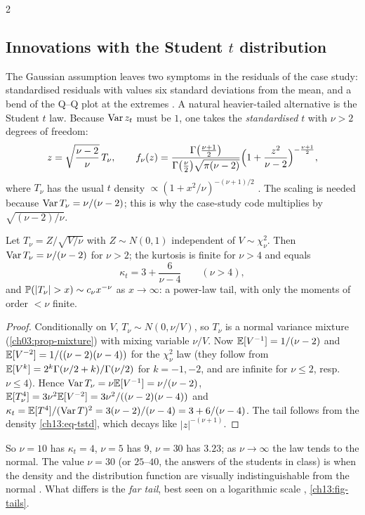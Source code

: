 \begin{paracol}{2}
\subsection{Innovations with the Student $t$ distribution}\label{ch13:sec-t}
The Gaussian assumption leaves two symptoms in the residuals of the case study: standardised residuals with values six standard deviations from the mean, and a bend of the Q--Q plot at the extremes
. A natural heavier-tailed alternative is the Student $t$ law. Because $\operatorname{Var} z_t$ must be $1$, one takes the \emph{standardised} $t$ with $\nu>2$ degrees of freedom:
\begin{equation}\label{ch13:eq-tstd}
  z=\sqrt{\frac{\nu-2}{\nu}}\,T_\nu,\qquad
  f_\nu(z)=\frac{\Gamma\bigl(\tfrac{\nu+1}2\bigr)}{\Gamma\bigl(\tfrac\nu2\bigr)\sqrt{\pi(\nu-2)}}\Bigl(1+\frac{z^2}{\nu-2}\Bigr)^{-\frac{\nu+1}2},
\end{equation}
where $T_\nu$ has the usual $t$ density $\propto(1+x^2/\nu)^{-(\nu+1)/2}$ . The scaling is needed because $\operatorname{Var} T_\nu=\nu/(\nu-2)$; this is why the case-study code multiplies by $\sqrt{(\nu-2)/\nu}$.

\begin{proposition}\label{ch13:prop-t}
Let $T_\nu=Z/\sqrt{V/\nu}$ with $Z\sim N(0,1)$ independent of $V\sim\chi^2_\nu$. Then $\operatorname{Var} T_\nu=\nu/(\nu-2)$ for $\nu>2$; the kurtosis is finite for $\nu>4$ and equals
\[
  \kappa_t=3+\frac6{\nu-4}\qquad(\nu>4),
\]
and $\Prob(|T_\nu|>x)\sim c_\nu x^{-\nu}$ as $x\to\infty$: a power-law tail, with only the moments of order $<\nu$ finite.
\end{proposition}
\begin{proof}
Conditionally on $V$, $T_\nu\sim N(0,\nu/V)$, so $T_\nu$ is a normal variance mixture (\cref{ch03:prop-mixture}) with mixing variable $\nu/V$. Now $\mathbb{E}[V^{-1}]=1/(\nu-2)$ and $\mathbb{E}[V^{-2}]=1/((\nu-2)(\nu-4))$ for the $\chi^2_\nu$ law
(they follow from $\mathbb{E}[V^{k}]=2^k\Gamma(\nu/2+k)/\Gamma(\nu/2)$ for $k=-1,-2$, and are infinite for $\nu\le2$, resp.\ $\nu\le4$). Hence $\operatorname{Var} T_\nu=\nu\mathbb{E}[V^{-1}]=\nu/(\nu-2)$, $\mathbb{E}[T_\nu^4]=3\nu^2\mathbb{E}[V^{-2}]=3\nu^2/((\nu-2)(\nu-4))$ and
$\kappa_t=\mathbb{E}[T^4]/(\operatorname{Var} T)^2=3(\nu-2)/(\nu-4)=3+6/(\nu-4)$. The tail follows from the density \eqref{ch13:eq-tstd}, which decays like $|z|^{-(\nu+1)}$.
\end{proof}
So $\nu=10$ has $\kappa_t=4$, $\nu=5$ has $9$, $\nu=30$ has $3.23$; as $\nu\to\infty$ the law tends to the normal. The value $\nu=30$ (or $25$--$40$, the answers of the students in class) is when the density and the distribution function are
visually indistinguishable from the normal . What differs is the \emph{far tail}, best seen on a logarithmic scale , \cref{ch13:fig-tails}.


\end{paracol}
